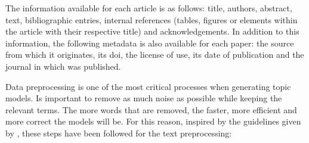 \documentclass[a4paper,10pt]{article}
\begin{document}
The information available for each article is as follows: title, authors, abstract, text, bibliographic entries, internal references (tables, figures or elements within the article with their respective title) and acknowledgements. In addition to this information, the following metadata is also available for each paper: the source from which it originates, its doi, the license of use, its date of publication and the journal in which was published.

Data preprocessing is one of the most critical processes when generating topic models. Is important to remove as much noise as possible while keeping the relevant terms. The more words that are removed, the faster, more efficient and more correct the models will be. For this reason, inspired by the guidelines given by \cite{LDAMethodology}, these steps have been followed for the text preprocessing:
\end{document}
